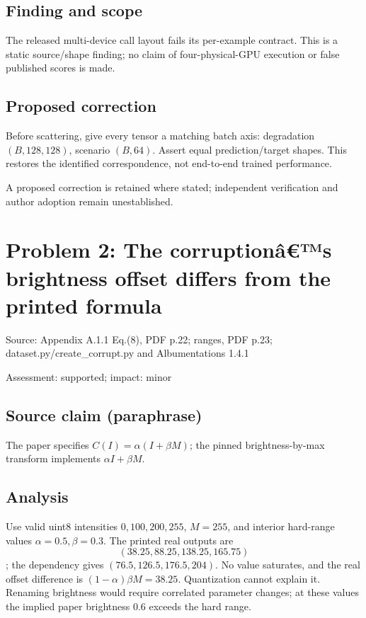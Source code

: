 \documentclass[11pt]{article}
\begin{document}
\subsection*{Finding and scope}

The released multi-device call layout fails its per-example contract. This is a static source/shape finding; no claim of four-physical-GPU execution or false published scores is made.

\subsection*{Proposed correction}

Before scattering, give every tensor a matching batch axis: degradation \((B,128,128)\), scenario \((B,64)\). Assert equal prediction/target shapes. This restores the identified correspondence, not end-to-end trained performance.

A proposed correction is retained where stated; independent verification and author adoption remain unestablished.

\section*{Problem 2: The corruptionâ€™s brightness offset differs from the printed formula}

Source: Appendix A.1.1 Eq.(8), PDF p.22; ranges, PDF p.23; dataset.py/create\_corrupt.py and Albumentations 1.4.1

Assessment: supported; impact: minor

\subsection*{Source claim (paraphrase)}

The paper specifies \(C(I)=\alpha(I+\beta M)\); the pinned brightness-by-max transform implements \(\alpha I+\beta M\).

\subsection*{Analysis}

Use valid uint8 intensities \(0,100,200,255\), \(M=255\), and interior hard-range values \(\alpha=0.5,\beta=0.3\). The printed real outputs are \[(38.25,88.25,138.25,165.75)\]; the dependency gives \((76.5,126.5,176.5,204)\). No value saturates, and the real offset difference is \((1-\alpha)\beta M=38.25\). Quantization cannot explain it. Renaming brightness would require correlated parameter changes; at these values the implied paper brightness \(0.6\) exceeds the hard range.
\end{document}
